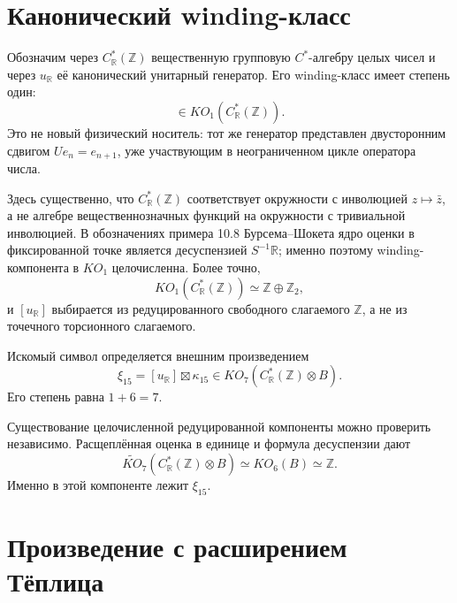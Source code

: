 \section{Канонический winding-класс}

Обозначим через $C^*_{\mathbb R}(\mathbb Z)$ вещественную групповую
$C^*$-алгебру целых чисел и через $u_{\mathbb R}$ её канонический
унитарный генератор. Его winding-класс имеет степень один:
\begin{equation}
 [u_{\mathbb R}]\in KO_1(C^*_{\mathbb R}(\mathbb Z)).
 \label{eq:v5-ko7-real-winding}
\end{equation}
Это не новый физический носитель: тот же генератор представлен
двусторонним сдвигом $Ue_n=e_{n+1}$, уже участвующим в неограниченном
цикле оператора числа.

Здесь существенно, что $C^*_{\mathbb R}(\mathbb Z)$ соответствует
окружности с инволюцией $z\mapsto\bar z$, а не алгебре вещественнозначных
функций на окружности с тривиальной инволюцией. В обозначениях примера
10.8 Бурсема--Шокета ядро оценки в фиксированной точке является
десуспензией $S^{-1}\mathbb R$; именно поэтому winding-компонента в
$KO_1$ целочисленна. Более точно,
\begin{equation}
 KO_1(C^*_{\mathbb R}(\mathbb Z))\simeq\mathbb Z\oplus\mathbb Z_2,
\end{equation}
и $[u_{\mathbb R}]$ выбирается из редуцированного свободного слагаемого
$\mathbb Z$, а не из точечного торсионного слагаемого.

Искомый символ определяется внешним произведением
\begin{equation}
 \xi_{15}
 =[u_{\mathbb R}]\boxtimes\kappa_{15}
 \in KO_7(C^*_{\mathbb R}(\mathbb Z)\otimes B).
 \label{eq:v5-ko7-symbol}
\end{equation}
Его степень равна $1+6=7$.

Существование целочисленной редуцированной компоненты можно проверить
независимо. Расщеплённая оценка в единице и формула десуспензии дают
\begin{equation}
 \widetilde{KO}_7(C^*_{\mathbb R}(\mathbb Z)\otimes B)
 \simeq KO_6(B)\simeq\mathbb Z.
 \label{eq:v5-ko7-reduced-group}
\end{equation}
Именно в этой компоненте лежит $\xi_{15}$.

\section{Произведение с расширением Тёплица}

